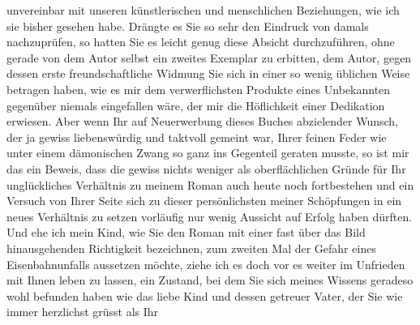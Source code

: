                unvereinbar mit unseren künstlerischen und menschlichen Beziehungen, wie ich sie
               bisher gesehen habe. Drängte es Sie so sehr den Eindruck von damals nachzuprüfen, so
               hatten Sie es leicht genug diese Absicht durchzuführen, ohne gerade von dem Autor
               selbst ein zweites Exemplar zu erbitten, dem Autor, gegen dessen erste
               freundschaftliche Widmung Sie sich in einer so wenig üblichen Weise betragen haben,
               wie es mir dem verwerflichsten Produkte eines Unbekannten gegenüber niemals einge{\pb}fallen wäre, der mir die Höflichkeit einer Dedikation
               erwiesen. Aber wenn Ihr auf Neuerwerbung dieses Buches abzielender Wunsch, der ja gewiss liebenswürdig und
               taktvoll gemeint war, Ihrer feinen Feder wie unter einem dämonischen Zwang so ganz
               ins Gegenteil geraten musste, so ist mir das ein Beweis, dass die gewiss nichts
               weniger als oberflächlichen Gründe für Ihr unglückliches Verhältnis zu meinem Roman auch heute noch
               fortbestehen und ein Versuch von Ihrer Seite sich zu dieser persönlichsten meiner
               Schöpfungen in ein neues Verhältnis zu setzen vorläufig nur wenig Aussicht auf Erfolg
               haben dürften. Und ehe ich mein Kind, wie Sie den Roman mit einer fast über das Bild hinausgehenden Richtigkeit bezeichnen,
               zum zweiten Mal der Gefahr eines \label{K_L01975-1v}\label{K_L01975-1} Eisenbahnunfalls aussetzen möchte, ziehe ich es doch vor
               es weiter im Unfrieden mit Ihnen leben zu lassen, ein Zustand, bei dem Sie sich
               meines Wissens geradeso wohl befunden haben wie das liebe Kind und dessen getreuer Vater, der Sie wie
               immer herzlichst grüsst als\pend
           \pstart Ihr\pend{}\endnumbering{}  
      